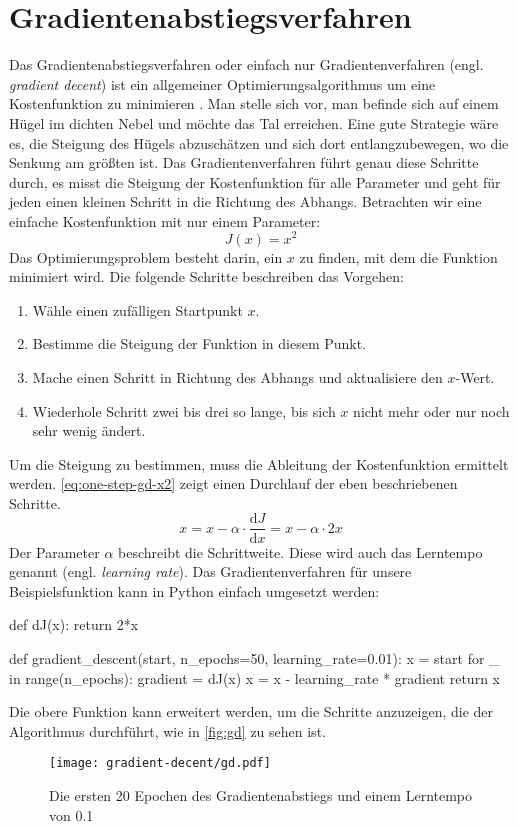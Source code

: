 \chapter{Gradientenabstiegsverfahren}
Das Gradientenabstiegsverfahren oder einfach nur Gradientenverfahren
(engl. \textit{gradient decent})
ist ein allgemeiner Optimierungsalgorithmus
um eine Kostenfunktion zu minimieren \parencite[118]{book:hands-on-ml}.
Man stelle sich vor, man befinde sich auf einem Hügel im dichten Nebel
und möchte das Tal erreichen.
Eine gute Strategie wäre es, die Steigung des
Hügels abzuschätzen und sich dort entlangzubewegen,
wo die Senkung am größten ist.
Das Gradientenverfahren führt genau diese Schritte durch,
es misst die Steigung der Kostenfunktion für alle Parameter
und geht für jeden einen kleinen Schritt in die Richtung des Abhangs.
Betrachten wir eine einfache Kostenfunktion
mit nur einem Parameter:
\begin{equation*}
  J(x) = x^2 
\end{equation*}
Das Optimierungsproblem besteht darin, ein $x$ zu finden, mit dem die Funktion minimiert wird.
Die folgende Schritte beschreiben das Vorgehen:
\begin{enumerate}
  \item Wähle einen zufälligen Startpunkt $x$.
  \item Bestimme die Steigung der Funktion in diesem Punkt.
  \item Mache einen Schritt in Richtung des Abhangs und aktualisiere den $x$-Wert.
  \item Wiederhole Schritt zwei bis drei so lange,
        bis sich $x$ nicht mehr oder nur noch sehr wenig ändert.
\end{enumerate}
Um die Steigung zu bestimmen, muss die Ableitung der Kostenfunktion ermittelt werden.
\autoref{eq:one-step-gd-x2} zeigt einen Durchlauf der eben beschriebenen Schritte.
\begin{equation}
  x = x - \alpha \cdot \frac{\mathrm{d}J}{\mathrm{d}x} = x - \alpha \cdot 2x
  \label{eq:one-step-gd-x2}
\end{equation}
Der Parameter $\alpha$ beschreibt die Schrittweite. Diese wird auch das
Lerntempo genannt (engl. \textit{learning rate}).
Das Gradientenverfahren für unsere Beispielsfunktion kann in Python 
einfach umgesetzt werden:
\begin{pythoncode}
def dJ(x):
    return 2*x

def gradient_descent(start, n_epochs=50, learning_rate=0.01):
    x = start
    for _ in range(n_epochs):
        gradient = dJ(x)
        x = x - learning_rate * gradient
    return x
\end{pythoncode}
Die obere Funktion kann erweitert werden, um die Schritte anzuzeigen,
die der Algorithmus durchführt, wie in \autoref{fig:gd} zu sehen ist.
\begin{figure}[h!]
  \centering
  \texttt{[image: gradient-decent/gd.pdf]}
  \caption{Die ersten 20 Epochen des Gradientenabstiegs und einem Lerntempo von \num{0.1}}
  \label{fig:gd}
\end{figure}

